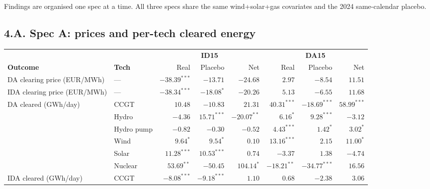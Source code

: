 \documentclass[11pt]{article}
\begin{document}
\noindent Findings are organised one spec at a time. All three specs share the same wind+solar+gas covariates and the 2024 same-calendar placebo.

\subsection*{4.A. Spec A: prices and per-tech cleared energy}\label{sec:4-specA}
\begin{center}
\footnotesize
\setlength{\tabcolsep}{4pt}
\begin{tabular}{l l r r r r r r}
\toprule
                & & \multicolumn{3}{c}{\textbf{ID15}} & \multicolumn{3}{c}{\textbf{DA15}} \\
\cmidrule(lr){3-5} \cmidrule(lr){6-8}
\textbf{Outcome} & \textbf{Tech} & Real & Placebo & Net & Real & Placebo & Net \\
\midrule
DA clearing price (EUR/MWh)  & ---        & $-38.39^{***}$ & $-13.71$       & $-24.68$         & $2.97$         & $-8.54$         & $11.51$ \\
IDA clearing price (EUR/MWh) & ---        & $-38.34^{***}$ & $-18.08^{*}$   & $-20.26$         & $5.13$         & $-6.55$         & $11.68$ \\
\addlinespace
DA cleared (GWh/day)         & CCGT       & $10.48$        & $-10.83$       & $21.31$          & $40.31^{***}$  & $-18.69^{***}$  & $58.99^{***}$ \\
                             & Hydro      & $-4.36$        & $15.71^{***}$  & $-20.07^{**}$    & $6.16^{*}$     & $9.28^{***}$    & $-3.12$ \\
                             & Hydro pump & $-0.82$        & $-0.30$        & $-0.52$          & $4.43^{***}$   & $1.42^{*}$      & $3.02^{*}$ \\
                             & Wind       & $9.64^{*}$     & $9.54^{*}$     & $0.10$           & $13.16^{***}$  & $2.15$          & $11.00^{*}$ \\
                             & Solar      & $11.28^{***}$  & $10.53^{***}$  & $0.74$           & $-3.37$        & $1.38$          & $-4.74$ \\
                             & Nuclear    & $53.69^{**}$   & $-50.45$       & $104.14^{*}$     & $-18.21^{**}$  & $-34.77^{***}$  & $16.56$ \\
\addlinespace
IDA cleared (GWh/day)        & CCGT       & $-8.08^{***}$  & $-9.18^{***}$  & $1.10$           & $0.68$         & $-2.38$         & $3.06$ \\

\end{tabular}
\end{center}
\end{document}
